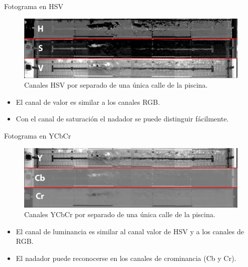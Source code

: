\documentclass[11pt]{beamer}
\begin{document}
        \begin{frame}{Fotograma en HSV}
            \begin{figure}
                \centering
                \includegraphics[scale=0.22]{imagenes/HSV_LANE.png}  
                \caption{Canales HSV por separado de una única calle de la piscina.}
                \label{fig:callehsv}
            \end{figure}
            \begin{itemize}
                \item El canal de valor es similar a los canales RGB.
                \item Con el canal de saturación el nadador se puede distinguir fácilmente.
            \end{itemize}
             
         \end{frame}
         
        \begin{frame}{Fotograma en YCbCr}
            \begin{figure}
                \centering
                \includegraphics[scale=0.22]{imagenes/YCBCR_LANE.png}  
                \caption{Canales YCbCr por separado de una única calle de la piscina.}
                \label{fig:calleycbcr}
            \end{figure}
            \begin{itemize}
                \item El canal de luminancia es similar al canal valor de HSV y a los canales de RGB.
                \item El nadador puede reconocerse en los canales de crominancia (Cb y Cr).
            \end{itemize}
         \end{frame}
         
\end{document}
